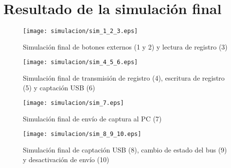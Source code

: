 \chapter{Resultado de la simulación final}
\label{ch:simulacion-final}

\begin{figure}[htbp]
    \centering
    \hspace*{-1cm}\texttt{[image: simulacion/sim\_1\_2\_3.eps]}
    \caption{Simulación final de botones externos (1 y 2) y lectura de registro (3)}
    \label{fig:simulacion_1_2_3}
\end{figure}

\begin{figure}[htbp]
    \centering
    \hspace*{-1.25cm}\texttt{[image: simulacion/sim\_4\_5\_6.eps]}
    \caption{Simulación final de transmisión de registro (4), escritura de registro (5) y captación USB (6)}
    \label{fig:simulacion_4_5_6}
\end{figure}

\begin{figure}[htbp]
    \centering
    \hspace*{-0.9cm}\texttt{[image: simulacion/sim\_7.eps]}
    \caption{Simulación final de envío de captura al PC (7)}
    \label{fig:simulacion_7}
\end{figure}

\begin{figure}[htbp]
    \centering
    \hspace*{-1.1cm}\texttt{[image: simulacion/sim\_8\_9\_10.eps]}
    \caption{Simulación final de captación USB (8), cambio de estado del bus (9) y desactivación de envío (10)}
    \label{fig:simulacion_8_9_10}
\end{figure}
